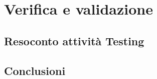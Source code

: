 
\pagestyle{IHA-fancy-style}
\chapter{Verifica e validazione}
\label{cap:verifica-validazione}

\section{Resoconto attività Testing}

\section{Conclusioni}
